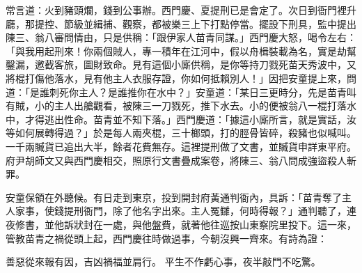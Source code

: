 常言道：火到豬頭爛，錢到公事辦。西門慶、夏提刑已是會定了。次日到衙門裡升廳，那提控、節級並緝捕、觀察，都被樂三上下打點停當。擺設下刑具，監中提出陳三、翁八審問情由，只是供稱：「跟伊家人苗青同謀。」西門慶大怒，喝令左右：「與我用起刑來！你兩個賊人，專一積年在江河中，假以舟楫裝載為名，實是劫幫鑿漏，邀截客旅，圖財致命。見有這個小廝供稱，是你等持刀戮死苗天秀波中，又將棍打傷他落水，見有他主人衣服存證，你如何抵賴別人！」因把安童提上來，問道：「是誰刺死你主人？是誰推你在水中？」安童道：「某日三更時分，先是苗青叫有賊，小的主人出艙觀看，被陳三一刀戮死，推下水去。小的便被翁八一棍打落水中，才得逃出性命。苗青並不知下落。」西門慶道：「據這小廝所言，就是實話，汝等如何展轉得過？」於是每人兩夾棍，三十榔頭，打的脛骨皆碎，殺豬也似喊叫。一千兩贓貨已追出大半，餘者花費無存。這裡提刑做了文書，並贓貨申詳東平府。府尹胡師文又與西門慶相交，照原行文書疊成案卷，將陳三、翁八問成強盜殺人斬罪。

安童保領在外聽候。有日走到東京，投到開封府黃通判衙內，具訴：「苗青奪了主人家事，使錢提刑衙門，除了他名字出來。主人冤讎，何時得報？」通判聽了，連夜修書，並他訴狀封在一處，與他盤費，就著他往巡按山東察院里投下。這一來，管教苗青之禍從頭上起，西門慶往時做過事，今朝沒興一齊來。有詩為證：

善惡從來報有因，吉凶禍福並肩行。
平生不作虧心事，夜半敲門不吃驚。

